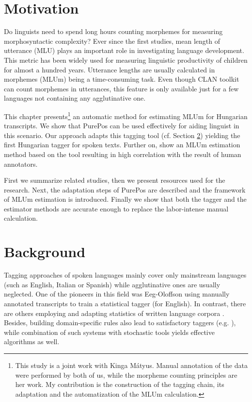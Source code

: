 
\section{Motivation}

Do linguists need to spend long hours counting morphemes for measuring morphosyntactic complexity? 
Ever since the first studies, mean length of utterance (MLU) plays an important role in investigating language development. 
This metric has been widely used for measuring linguistic productivity of children for almost a hundred years. 
Utterance lengths are usually calculated in morphemes (MLUm) being a time-consuming task. 
Even though CLAN toolkit can count morphemes in utterances, this feature is only available just for a few languages not containing any agglutinative one.

This chapter presents\footnote{This study is a joint work with Kinga Mátyus. 
Manual annotation of the data were performed by both of us, while the morpheme counting principles are her work. 
My contribution is the construction of the tagging chain, its adaptation and the automatization of the MLUm calculation.} 
an automatic method for estimating MLUm for Hungarian transcripts. 
We show that PurePos can be used effectively for aiding linguist in this scenario. 
Our approach adapts this tagging tool (cf. Section \ref{}) yielding the first Hungarian tagger for spoken texts. 
Further on, show an MLUm estimation method based on the tool resulting in high correlation with the result of human annotators. 

First we summarize related studies, then we present resources used for the research. 
Next, the adaptation steps of PurePos are described and the framework of MLUm estimation is introduced. 
Finally we show that both the tagger and the estimator methods are accurate enough to replace the labor-intense manual calculation.

\section{Background}

Tagging approaches of spoken languages mainly cover only mainstream languages (such as English, Italian or Spanish) while agglutinative ones are usually neglected. 
One of the pioneers in this field was Eeg-Oloffson \cite{Svartvik1982} using  manually annotated transcripts to train a statistical tagger (for English). 
In contrast, there are others employing and adapting statistics of written language corpora \cite{Mendes2004,Nivre1996,Panunzi2004}.
Besides, building domain-specific rules also lead to satisfactory taggers (e.g. \cite{Moreno2003}),
while combination of such systems with stochastic tools \cite{Bick2012} yields effective algorithms as well. 

